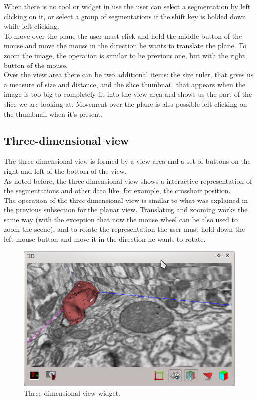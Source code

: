 When there is no tool or widget in use the user can select a segmentation by left clicking
on it, or select a group of segmentations if the shift key is holded down while left clicking.\\
To move over the plane the user must click and hold the middle button of the mouse and move
the mouse in the direction he wants to translate the plane. To zoom the image, the operation is
similar to he previous one, but with the right button of the mouse. \\
Over the view area there can be two additional items: the size ruler, that gives us a measure of
size and distance, and the slice thumbnail, that appears when the image is too big to completely
fit into the view area and shows us the part of the slice we are looking at. Movement over the
plane is also possible left clicking on the thumbnail when it's present.

\subsection{Three-dimensional view}

The three-dimensional view is formed by a view area and a set of buttons on the right and 
left of the bottom of the view. \\
As noted before, the three dimensional view shows a interactive representation of the
segmentations and other data like, for example, the crosshair position.\\
The operation of the three-dimensional view is similar to what was explained in the previous
subsection for the planar view. Translating and zooming works the same way (with the exception
that now the mouse wheel can be also used to zoom the scene), and to rotate the representation
the user must hold down the left mouse button and move it in the direction he wants to rotate.\\

\begin{figure}[H]
\centering
\includegraphics{fig/VolumeView}
\caption{Three-dimensional view widget.}
\end{figure}

